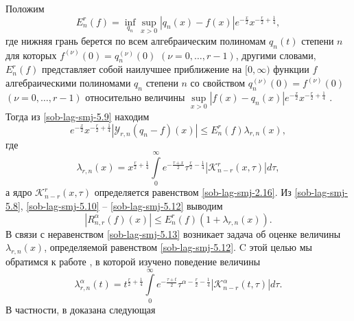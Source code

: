 Положим
\begin{equation}\label{sob-lag-smj-5.10}
  E_n^r(f)=\inf\limits_{q_n}\sup\limits_{x>0}|q_n(x)-f(x)|e^{-\frac x2}
  x^{-\frac r2+\frac14},
\end{equation}
где нижняя грань берется по всем алгебраическим полиномам $q_n(t)$ степени $n$ для которых $f^{(\nu)}(0)=q_n^{(\nu)}(0)$ $(\nu=0,\ldots,r-1)$, другими словами, $E_n^r(f)$ представляет собой наилучшее приближение на $[0,\infty)$ функции $f$ алгебраическими полиномами $q_n$   степени $n$ со свойством $q_n^{(\nu)}(0)=f^{(\nu)}(0)$ $(\nu=0,\ldots,r-1)$ относительно величины $\sup\limits_{x>0}|f(x)-q_n(x)|e^{-\frac x2}x^{-\frac r2+\frac14}$ . Тогда из \eqref{sob-lag-smj-5.9} находим
\begin{equation}\label{sob-lag-smj-5.11}
 e^{-\frac{x}{2}} x^{-\frac r2+\frac14}|\mathcal{Y}_{r,n}(q_n-f)(x)|\le E_n^r(f)\lambda_{r,n}(x),
\end{equation}
где
\begin{equation}\label{sob-lag-smj-5.12}
  \lambda_{r,n}(x)=x^{\frac r2+\frac14}\int\limits_0^\infty e^{-\frac{\tau+x}2}\tau^{\frac r2-\frac14}|\mathcal{K}_{n-r}^r(x,\tau)|d\tau,
\end{equation}
а ядро $\mathcal{K}_{n-r}^r(x,\tau)$ определяется равенством \eqref{sob-lag-smj-2.16}.
Из \eqref{sob-lag-smj-5.8}, \eqref{sob-lag-smj-5.10} -- \eqref{sob-lag-smj-5.12} выводим
\begin{equation}\label{sob-lag-smj-5.13}
  |R_{n,r}^\alpha(f)(x)|\le E_n^r(f)(1+\lambda_{r,n}(x)).
\end{equation}
В связи с неравенством \eqref{sob-lag-smj-5.13} возникает задача об оценке величины $\lambda_{r,n}(x)$, определяемой равенством \eqref{sob-lag-smj-5.12}.  C этой целью мы обратимся к работе \cite{sob-lag-smj-SHII}, в которой изучено поведение величины
\begin{equation*}
  \lambda_{r,n}^\alpha(t)=t^{\frac r2+\frac14}\int\limits_0^\infty e^{-\frac{\tau+t}2}\tau^{\alpha-\frac r2-\frac14}|\mathcal{K}_{n-r}^\alpha(t,\tau)|d\tau.
\end{equation*}
В частности, в \cite{sob-lag-smj-SHII} доказана следующая

